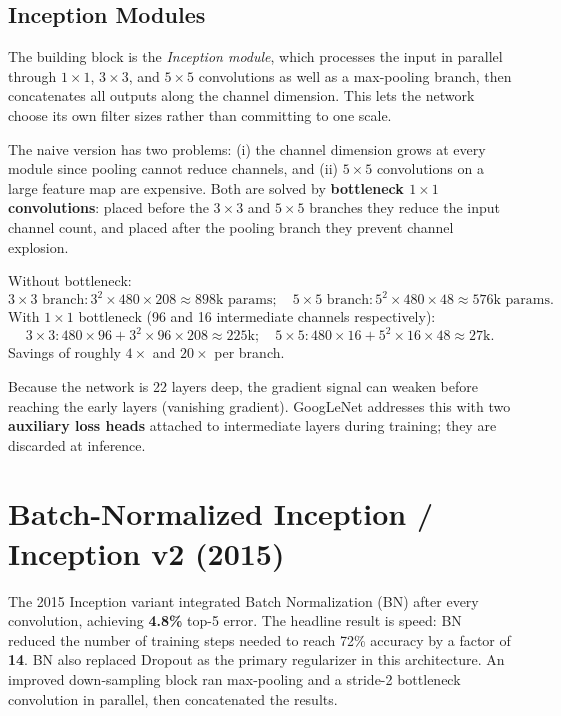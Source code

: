 \documentclass[11pt, oneside]{book}
\begin{document}
\subsection{Inception Modules}

The building block is the \emph{Inception module}, which processes the input
in parallel through $1\times1$, $3\times3$, and $5\times5$ convolutions
as well as a max-pooling branch, then concatenates all outputs along the channel dimension.
This lets the network choose its own filter sizes rather than committing to one scale.

The naive version has two problems:
(i) the channel dimension grows at every module since pooling cannot reduce channels, and
(ii) $5\times5$ convolutions on a large feature map are expensive.
Both are solved by \textbf{bottleneck $1\times1$ convolutions}:
placed before the $3\times3$ and $5\times5$ branches they reduce the input channel count,
and placed after the pooling branch they prevent channel explosion.

\begin{thmbox}[title={Bottleneck Parameter Savings (Inception 4a example)}]
Without bottleneck:
\[
  3\!\times\!3\text{ branch}: 3^2 \times 480 \times 208 \approx 898\text{k params};\quad
  5\!\times\!5\text{ branch}: 5^2 \times 480 \times 48 \approx 576\text{k params}.
\]
With $1\times1$ bottleneck (96 and 16 intermediate channels respectively):
\[
  3\!\times\!3: 480 \times 96 + 3^2 \times 96 \times 208 \approx 225\text{k};\quad
  5\!\times\!5: 480 \times 16 + 5^2 \times 16 \times 48 \approx 27\text{k}.
\]
Savings of roughly $4\times$ and $20\times$ per branch.
\end{thmbox}

Because the network is 22 layers deep, the gradient signal can weaken before
reaching the early layers (vanishing gradient).
GoogLeNet addresses this with two \textbf{auxiliary loss heads} attached to
intermediate layers during training; they are discarded at inference.

\section{Batch-Normalized Inception / Inception v2 (2015)}

The 2015 Inception variant integrated Batch Normalization (BN) after every
convolution, achieving \textbf{4.8\%} top-5 error.
The headline result is speed: BN reduced the number of training steps needed to
reach 72\% accuracy by a factor of \textbf{14}.
BN also replaced Dropout as the primary regularizer in this architecture.
An improved down-sampling block ran max-pooling and a stride-2 bottleneck
convolution in parallel, then concatenated the results.
\end{document}
